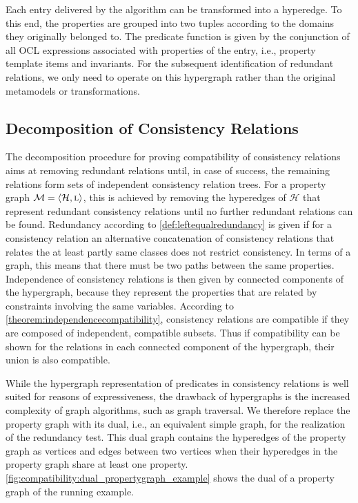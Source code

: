 Each entry delivered by the algorithm can be transformed into a hyperedge.
To this end, the properties are grouped into two tuples according to the domains they originally belonged to.
The predicate function is given by the conjunction of all \gls{OCL} expressions associated with properties of the entry, i.e., property template items and invariants.
For the subsequent identification of redundant relations, we only need to operate on this hypergraph rather than the original metamodels or \qvtr transformations.


\subsection{Decomposition of Consistency Relations}

The decomposition procedure for proving compatibility of consistency relations aims at removing redundant relations until, in case of success, the remaining relations form sets of independent consistency relation trees.
For a property graph $\mathcal{M} = \langle \mathcal{H}, \textsc{l} \rangle$, this is achieved by removing the hyperedges of $\mathcal{H}$ that represent redundant consistency relations until no further redundant relations can be found.
Redundancy according to \autoref{def:leftequalredundancy} is given if for a consistency relation an alternative concatenation of consistency relations that relates the at least partly same classes does not restrict consistency.
In terms of a graph, this means that there must be two paths between the same properties.
Independence of consistency relations is then given by connected components of the hypergraph, because they represent the properties that are related by constraints involving the same \qvtr variables.
According to \autoref{theorem:independencecompatibility}, consistency relations are compatible if they are composed of independent, compatible subsets.
Thus if compatibility can be shown for the relations in each connected component of the hypergraph, their union is also compatible.

While the hypergraph representation of predicates in consistency relations is well suited for reasons of expressiveness, the drawback of hypergraphs is the increased complexity of graph algorithms, such as graph traversal.
We therefore replace the property graph with its dual, i.e., an equivalent simple graph, for the realization of the redundancy test.
This dual graph contains the hyperedges of the property graph as vertices and edges between two vertices when their hyperedges in the property graph share at least one property.
\autoref{fig:compatibility:dual_propertygraph_example} shows the dual of a property graph of the running example.

